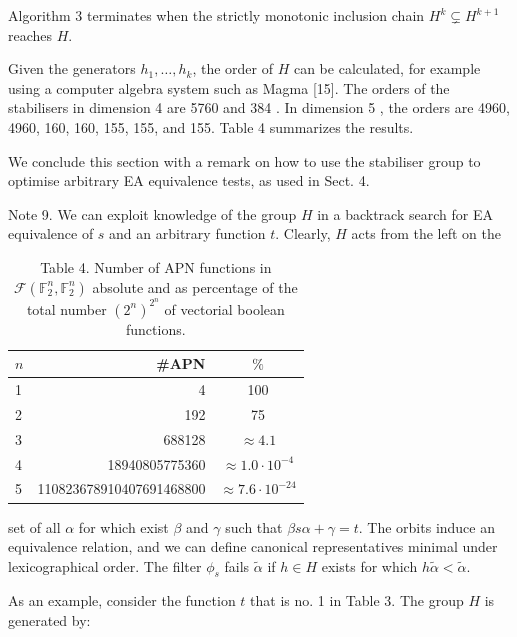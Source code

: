 \documentclass[10pt]{article}
\begin{document}
Algorithm 3 terminates when the strictly monotonic inclusion chain $H^{k} \subsetneq H^{k+1}$ reaches $H$.

Given the generators $h_{1}, \ldots, h_{k}$, the order of $H$ can be calculated, for example using a computer algebra system such as Magma [15]. The orders of the stabilisers in dimension 4 are 5760 and 384 . In dimension 5 , the orders are 4960, 4960, 160, 160, 155, 155, and 155. Table 4 summarizes the results.

We conclude this section with a remark on how to use the stabiliser group to optimise arbitrary EA equivalence tests, as used in Sect. 4.

Note 9. We can exploit knowledge of the group $H$ in a backtrack search for EA equivalence of $s$ and an arbitrary function $t$. Clearly, $H$ acts from the left on the

\begin{table}[h]
\begin{center}
\captionsetup{labelformat=empty}
\caption{Table 4. Number of APN functions in $\mathcal{F}\left(\mathbb{F}_{2}^{n}, \mathbb{F}_{2}^{n}\right)$ absolute and as percentage of the total number $\left(2^{n}\right)^{2^{n}}$ of vectorial boolean functions.}
\begin{tabular}{|l|r|c|}
\hline
$n$ & \#APN & $\%$ \\
\hline
1 & 4 & 100 \\
2 & 192 & 75 \\
3 & 688128 & $\approx 4.1$ \\
4 & 18940805775360 & $\approx 1.0 \cdot 10^{-4}$ \\
5 & 110823678910407691468800 & $\approx 7.6 \cdot 10^{-24}$ \\
\hline
\end{tabular}
\end{center}
\end{table}

set of all $\alpha$ for which exist $\beta$ and $\gamma$ such that $\beta s \alpha+\gamma=t$. The orbits induce an equivalence relation, and we can define canonical representatives minimal under lexicographical order. The filter $\phi_{s}$ fails $\tilde{\alpha}$ if $h \in H$ exists for which $h \tilde{\alpha}<\tilde{\alpha}$.

As an example, consider the function $t$ that is no. 1 in Table 3. The group $H$ is generated by:
\end{document}
